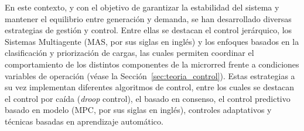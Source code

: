 En este contexto, y con el objetivo de garantizar la estabilidad del sistema y mantener el equilibrio entre generación y demanda, se han desarrollado diversas estrategias de gestión y control. Entre ellas se destacan el control jerárquico, los Sistemas Multiagente (MAS, por sus siglas en inglés) y los enfoques basados en la clasificación y priorización de cargas, las cuales permiten coordinar el comportamiento de los distintos componentes de la microrred frente a condiciones variables de operación (véase la Sección~\ref{sec:teoria_control}).
Estas estrategias a su vez implementan diferentes algoritmos de control, entre los cuales se destacan el control por caída (\textit{droop} control), el basado en consenso, el control predictivo basado en modelo (MPC, por sus siglas en inglés), controles adaptativos y técnicas basadas en aprendizaje automático.

